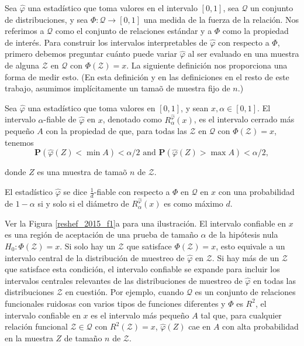 	Sea $\hat{\varphi}$ una estad\'istico que toma valores en el intervalo $[0,1]$, sea $\mathcal{Q}$ un conjunto de distribuciones, y sea $\Phi: \mathcal{Q} \rightarrow [0,1]$ una medida de la fuerza de la relaci\'on. Nos referimos a $\mathcal{Q}$ como el conjunto de relaciones est\'andar y a $\Phi$ como la propiedad de inter\'es. Para construir los intervalos interpretables de $\hat{\varphi}$ con respecto a $\Phi$, primero debemos preguntar cu\'anto puede variar $\hat{\varphi}$ al ser evaluado en una muestra de alguna $\mathcal{Z}$ en $\mathcal{Q}$ con $\Phi(\mathcal{Z})=x$. La siguiente definici\'on nos proporciona una forma de medir esto. (En esta definici\'on y en las definiciones en el resto de este trabajo, asumimos impl\'icitamente un tama\~o de muestra fijo de $n$.)


	\begin{defn}
		Sea $\hat{\varphi}$ una estad\'istico que toma valores en $[0,1]$, y sean $x, \alpha \in [0,1]$. El intervalo $\alpha$-fiable de $\hat{\varphi}$ en $x$, denotado como $R_\alpha^{\hat{\varphi}}(x)$, es el intervalo cerrado m\'as peque\~no $A$ con la propiedad de que, para todas las $\mathcal{Z}$ en $\mathcal{Q}$ con $\Phi(\mathcal{Z})=x$, tenemos
		$$
		\mathbf{P}(\hat{\varphi}(Z)<\min A)<\alpha / 2 \text { and } \mathbf{P}(\hat{\varphi}(Z)>\max A)<\alpha / 2,
		$$
		
		donde $Z$ es una muestra de tama\~o $n$ de $\mathcal{Z}$.
	\end{defn}

	El estad\'istico $\hat{\varphi}$ se dice $\frac{1}{d}$-fiable con respecto a $\Phi$ en $\mathcal{Q}$ en $x$ con una probabilidad de $1-\alpha$ si y solo si el di\'ametro de $R_\alpha^{\hat{\varphi}}(x)$ es como m\'aximo $d$.
	
		
	Ver la Figura \ref{reshef_2015_f1}a para una ilustraci\'on. El intervalo confiable en $x$ es una regi\'on de aceptaci\'on de una prueba de tama\~no $\alpha$ de la hip\'otesis nula $H_0: \Phi(\mathcal{Z})=x$. Si solo hay un $\mathcal{Z}$ que satisface $\Phi(\mathcal{Z})=x$, esto equivale a un intervalo central de la distribuci\'on de muestreo de $\hat{\varphi}$ en $\mathcal{Z}$. Si hay m\'as de un $\mathcal{Z}$ que satisface esta condici\'on, el intervalo confiable se expande para incluir los intervalos centrales relevantes de las distribuciones de muestreo de $\hat{\varphi}$ en todas las distribuciones $\mathcal{Z}$ en cuesti\'on. Por ejemplo, cuando $\mathcal{Q}$ es un conjunto de relaciones funcionales ruidosas con varios tipos de funciones diferentes y $\Phi$ es $R^2$, el intervalo confiable en $x$ es el intervalo m\'as peque\~no $A$ tal que, para cualquier relaci\'on funcional $\mathcal{Z} \in \mathcal{Q}$ con $R^2(\mathcal{Z})=x$, $\hat{\varphi}(Z)$ cae en $A$ con alta probabilidad en la muestra $Z$ de tama\~no $n$ de $\mathcal{Z}$.

